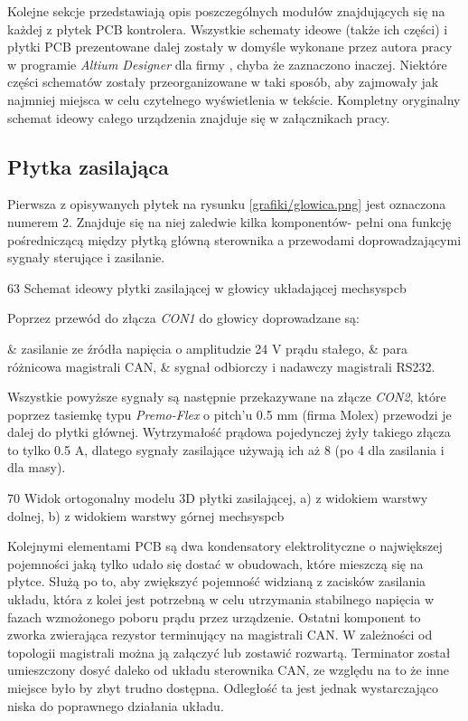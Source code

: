 Kolejne sekcje przedstawiają opis poszczególnych modułów znajdujących się na każdej z płytek PCB kontrolera. Wszystkie schematy ideowe (także ich części) i płytki PCB prezentowane dalej zostały w domyśle wykonane przez autora pracy w programie {\it Altium Designer} dla firmy \firma{}, chyba że zaznaczono inaczej. Niektóre części schematów zostały przeorganizowane w taki sposób, aby zajmowały jak najmniej miejsca w celu czytelnego wyświetlenia w tekście. Kompletny oryginalny schemat ideowy całego urządzenia znajduje się w załącznikach pracy.

\subsection{Płytka zasilająca}
\label{ss:power_board}

Pierwsza z opisywanych płytek na rysunku \ref{grafiki/glowica.png} jest oznaczona numerem 2. Znajduje się na niej zaledwie kilka komponentów- pełni ona funkcję pośredniczącą między płytką główną sterownika a przewodami doprowadzającymi sygnały sterujące i zasilanie.

	{63}
	{Schemat ideowy płytki zasilającej w głowicy układającej}
	{mechsyspcb}
	
Poprzez przewód do złącza {\it CON1} do głowicy doprowadzane są:

\begin{easylist}
	& zasilanie ze źródła napięcia o amplitudzie 24 V prądu stałego,
	& para różnicowa magistrali CAN,
	& sygnał odbiorczy i nadawczy magistrali RS232.
	\\
\end{easylist} 

Wszystkie powyższe sygnały są następnie przekazywane na złącze {\it CON2}, które poprzez tasiemkę typu {\it Premo-Flex} o pitch'u 0.5 mm (firma Molex) przewodzi je dalej do płytki głównej. Wytrzymałość prądowa pojedynczej żyły takiego złącza to tylko 0.5 A, dlatego sygnały zasilające używają ich aż 8 (po 4 dla zasilania i dla masy).

	{70}
	{Widok ortogonalny modelu 3D płytki zasilającej, a) z widokiem warstwy dolnej, b) z widokiem warstwy górnej}
	{mechsyspcb}

Kolejnymi elementami PCB są dwa kondensatory elektrolityczne o największej pojemności jaką tylko udało się dostać w obudowach, które mieszczą się na płytce. Służą po to, aby zwiększyć pojemność widzianą z zacisków zasilania układu, która z kolei jest potrzebną w celu utrzymania stabilnego napięcia w fazach wzmożonego poboru prądu przez urządzenie. Ostatni komponent to zworka zwierająca rezystor terminujący na magistrali CAN. W zależności od topologii magistrali można ją załączyć lub zostawić rozwartą. Terminator został umieszczony dosyć daleko od układu sterownika CAN, ze względu na to że inne miejsce było by zbyt trudno dostępna. Odległość ta jest jednak wystarczająco niska do poprawnego działania układu.

